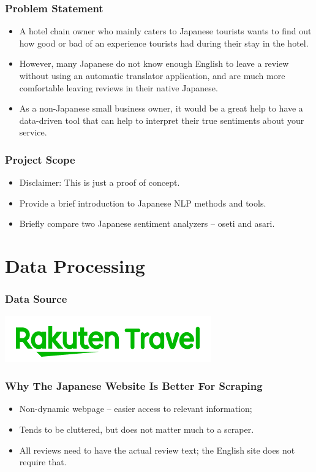 \documentclass[11pt]{beamer}
\begin{document}
	\begin{frame}
		\frametitle{Problem Statement}
		\begin{itemize}
			\item A hotel chain owner who mainly caters to Japanese tourists wants to find out how good or bad of an experience tourists had during their stay in the hotel.
			\pause
			\item However, many Japanese do not know enough English to leave a review without using an automatic translator application, and are much more comfortable leaving reviews in their native Japanese.
			\pause
			\item As a non-Japanese small business owner, it would be a great help to have a data-driven tool that can help to interpret their true sentiments about your service.
		\end{itemize}
	\end{frame}
	
	\begin{frame}
		\frametitle{Project Scope}
		\begin{itemize}
			\item Disclaimer: This is just a proof of concept.
			\pause
			\item Provide a brief introduction to Japanese NLP methods and tools.
			\pause
			\item Briefly compare two Japanese sentiment analyzers -- oseti and asari.
		\end{itemize}
	\end{frame}
		
	\section{Data Processing}
	
	\begin{frame}
		\frametitle{Data Source}
		\begin{center}
			\includegraphics[scale=0.6]{rt_logo}
		\end{center}
	\end{frame}
	
	\begin{frame}
		\frametitle{Why The Japanese Website Is Better For Scraping}
		\begin{itemize}
			\item Non-dynamic webpage -- easier access to relevant information;
			\pause
			\item Tends to be cluttered, but does not matter much to a scraper.
			\pause
			\item All reviews need to have the actual review text; the English site does not require that.
		\end{itemize}
	\end{frame}
	
\end{document}

